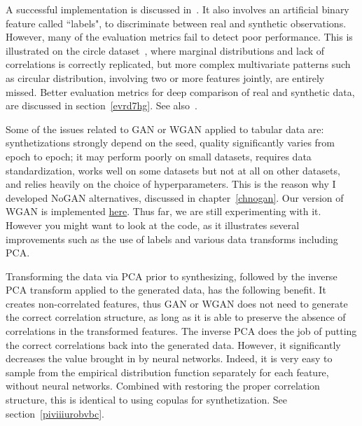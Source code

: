\documentclass[oneside,10pt]{book}
\begin{document}
A successful implementation is discussed in~\cite{ieeewgan}. It also involves an artificial binary feature called ``labels",
to discriminate between real and synthetic observations. However, many of the evaluation metrics fail to detect poor performance. This is illustrated on
 the circle dataset~\cite{vgvendors}, where marginal distributions and lack of correlations is correctly replicated, but more complex multivariate patterns such
 as circular distribution, involving two or more features jointly, are entirely missed. Better evaluation metrics for
\textcolor{index}{deep comparison} of real and synthetic data, are discussed in section~\ref{evrd7hg}.
 See also~\cite{ieeeaccess22}.

Some of the issues related to GAN or WGAN applied to tabular data are: synthetizations strongly depend on the seed, quality significantly varies from
 epoch to epoch; it may perform poorly on small datasets, requires data standardization, works well on some datasets but not at all on other datasets, and relies heavily on the choice of hyperparameters. This is the reason why I developed NoGAN alternatives, discussed in chapter~\ref{chnogan}. Our version of WGAN
 is implemented \href{https://github.com/VincentGranville/Main/blob/main/WGAN.py}{here}. Thus far, we are still experimenting with it. However you might want to look at the code, as it illustrates several improvements such as the use of labels and various data transforms including PCA.

Transforming the data via PCA prior to synthesizing, followed by the inverse PCA transform applied to the generated data, has the following benefit.
 It creates non-correlated features, thus GAN or WGAN does not need to generate the correct correlation structure, as long as it is able to
 preserve the absence of correlations in the transformed features. The inverse PCA does the job of putting the correct correlations back into the generated data. However, it significantly decreases the value brought in by neural networks. Indeed, it is very easy to sample from the
 \textcolor{index}{empirical distribution function} separately for each feature, without neural networks. Combined with restoring the proper correlation structure,
 this is identical to using \textcolor{index}{copulas} for synthetization. See section~\ref{piviiiurobvbc}.
\end{document}
